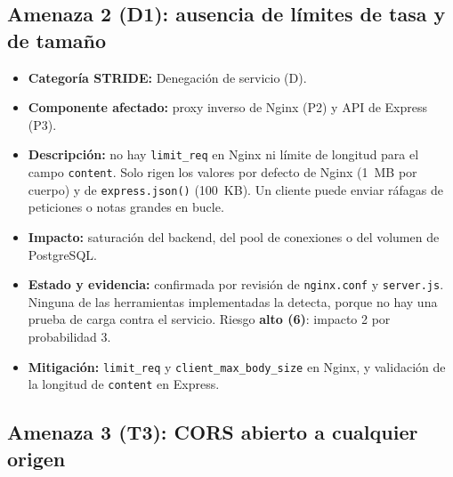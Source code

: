 
\subsection{Amenaza 2 (D1): ausencia de límites de tasa y de tamaño}

\begin{itemize}
    \item \textbf{Categoría STRIDE:} Denegación de servicio (D).
    \item \textbf{Componente afectado:} proxy inverso de Nginx (P2) y API
    de Express (P3).
    \item \textbf{Descripción:} no hay \texttt{limit\_req} en Nginx ni límite
    de longitud para el campo \texttt{content}. Solo rigen los valores por
    defecto de Nginx (1~MB por cuerpo) y de \texttt{express.json()}
    (100~KB). Un cliente puede enviar ráfagas de peticiones o notas grandes
    en bucle.
    \item \textbf{Impacto:} saturación del backend, del pool de conexiones o
    del volumen de PostgreSQL.
    \item \textbf{Estado y evidencia:} confirmada por revisión de
    \texttt{nginx.conf} y \texttt{server.js}. Ninguna de las herramientas
    implementadas la detecta, porque no hay una prueba de carga contra el
    servicio. Riesgo \textbf{alto (6)}: impacto 2 por probabilidad 3.
    \item \textbf{Mitigación:} \texttt{limit\_req} y
    \texttt{client\_max\_body\_size} en Nginx, y validación de la longitud de
    \texttt{content} en Express.
\end{itemize}


\subsection{Amenaza 3 (T3): CORS abierto a cualquier origen}

